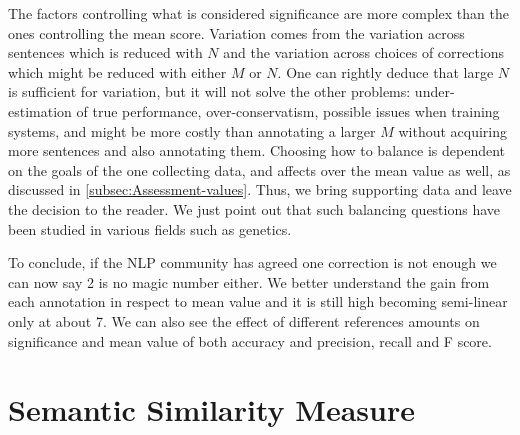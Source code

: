 \documentclass[letter,11pt]{article}
\newcommand{\com}[1]{}
\newcommand{\lc}[1]{\footnote{\color{green}LC: #1}}
\begin{document}
		The factors controlling what is considered significance are more complex than the ones controlling the mean score. Variation comes from the variation across sentences which is reduced with $N$ and the variation across choices of corrections which might be reduced with either $M$ or $N$. One can rightly deduce that large $N$ is sufficient for variation, but it will not solve the other problems: under-estimation of true performance,
		over-conservatism, possible issues when training systems, and might be more costly than annotating a larger $M$ without acquiring more sentences and also annotating them.
		Choosing how to balance is dependent on the goals of the one collecting data, and affects over the mean value as well, as discussed in \ref{subsec:Assessment-values}. Thus, we bring supporting data and leave the decision to the reader. We just point out that such balancing questions have been studied in various fields such as genetics\cite{ionita2010optimal}.
		
		\com{\lc{I think this can be omitted}
			So, why is significance more complicated? Basically, because variance is more complex than mean. While $\mathbb{E}_{y\sim d_x, x\sim L}\left(\hat{S}\right)$ vary only as we change $M$
			the number of annotations, but not $N$ the number of corrections,
			$Var_{y\sim d_x, x\sim L}(\hat{S})$ depends on both. We try to assess and give an upper
			bound on how much it varies for different $M$ and $N$, allowing
			for both a smart allocation of resources when building a corpus and for assessing on given corpora whether two correctors are actually different.
		}
		
		To conclude, if the NLP community has agreed one correction is not enough\cite{tetreault2008native}
		we can now say 2 is no magic number either. We better understand the gain from each annotation in respect to mean value and it is still high becoming semi-linear only at about 7. We can also see the effect of different references amounts on significance and mean value of both accuracy and precision, recall and F score.
		
		
		\section{Semantic Similarity Measure}\label{sec:Semantics}
		
		
\end{document}

